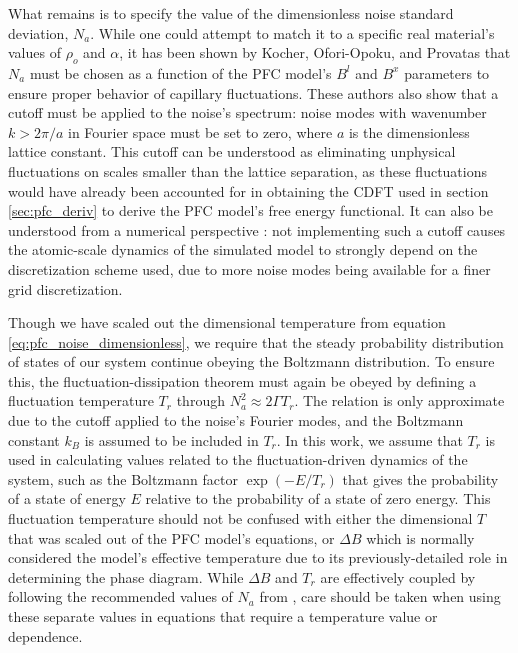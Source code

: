 What remains is to specify the value of the dimensionless noise standard deviation, $N_a$. While one could attempt to match it to a specific real material's values of $\rho_o$ and $\alpha$, it has been shown by Kocher, Ofori-Opoku, and Provatas \cite{kocher16} that $N_a$ must be chosen as a function of the PFC model's $B^l$ and $B^x$ parameters to ensure proper behavior of capillary fluctuations. These authors also show that a cutoff must be applied to the noise's spectrum: noise modes with wavenumber $k>2\pi/a$ in Fourier space must be set to zero, where $a$ is the dimensionless lattice constant. This cutoff can be understood as eliminating unphysical fluctuations on scales smaller than the lattice separation, as these fluctuations would have already been accounted for in obtaining the CDFT used in section \ref{sec:pfc_deriv} to derive the PFC model's free energy functional. It can also be understood from a numerical perspective \cite{plapp11}: not implementing such a cutoff causes the atomic-scale dynamics of the simulated model to strongly depend on the discretization scheme used, due to more noise modes being available for a finer grid discretization.

Though we have scaled out the dimensional temperature from equation \ref{eq:pfc_noise_dimensionless}, we require that the steady probability distribution of states of our system continue obeying the Boltzmann distribution. To ensure this, the fluctuation-dissipation theorem must again be obeyed \cite{sancho_noise} by defining a fluctuation temperature $T_{r}$ through $N_a^2\approx 2\Gamma T_{r}$. The relation is only approximate due to the cutoff applied to the noise's Fourier modes, and the Boltzmann constant $k_B$ is assumed to be included in $T_r$. In this work, we assume that $T_{r}$ is used in calculating values related to the fluctuation-driven dynamics of the system, such as the Boltzmann factor $\exp(-E/T_r)$ that gives the probability of a state of energy $E$ relative to the probability of a state of zero energy. This fluctuation temperature should not be confused with either the dimensional $T$ that was scaled out of the PFC model's equations, or $\Delta B$ which is normally considered the model's effective temperature due to its previously-detailed role in determining the phase diagram. While $\Delta B$ and $T_{r}$ are effectively coupled by following the recommended values of $N_a$ from \cite{kocher16}, care should be taken when using these separate values in equations that require a temperature value or dependence. 

